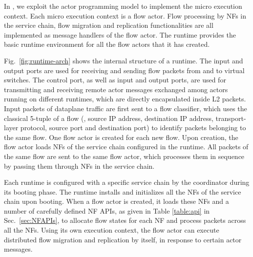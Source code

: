In \nfactor, we exploit the actor programming model to implement the micro execution context. Each micro execution context is a flow actor. Flow processing by NFs in the service chain, flow migration and replication functionalities are all implemented as message handlers of the flow actor. The runtime provides the basic runtime environment for all the flow actors that it has created.


Fig.~\ref{fig:runtime-arch} shows the internal structure of a runtime. The input and output ports are used for receiving and sending flow packets from and to virtual switches. The control port, as well as input and output ports, are used for transmitting and receiving remote actor messages exchanged among actors running on different runtimes, which are directly encapsulated inside L2 packets. %
 Input packets of dataplane traffic are first sent to a flow classifier, which uses the classical 5-tuple of a flow (\ie, source IP address, destination IP address, transport-layer protocol, source port and destination port) to identify packets belonging to the same flow. One flow actor is created for each new flow. Upon creation, the flow actor loads NFs of the service chain configured in the runtime. All packets of the same flow are sent to the same flow actor, which processes them in sequence by passing them through NFs in the service chain.

Each runtime is configured with a specific service chain by the coordinator during its booting phase. The runtime installs and initializes all the NFs of the service chain upon booting. When a flow actor is created, it loads these NFs and a number of carefully defined NF APIs, as given in Table \ref{table:api} in Sec.~\ref{sec:NFAPIs}, to allocate flow states for each NF and process packets across all the NFs. Using its own execution context, the flow actor can execute distributed flow migration and replication by itself, in response to certain actor messages.%



